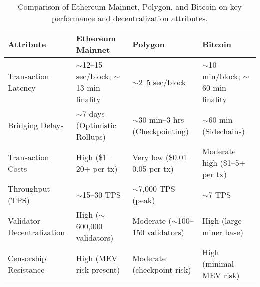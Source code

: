 \begin{table}[ht]
\centering
\begin{tabular}{|p{2cm}|p{2cm}|p{2cm}|p{2cm}|}
\hline
\textbf{Attribute} & \textbf{Ethereum Mainnet} & \textbf{Polygon} & \textbf{Bitcoin} \\
\hline
Transaction Latency & $\sim$12--15 sec/block; \newline $\sim$13 min finality & $\sim$2--5 sec/block & $\sim$10 min/block; \newline $\sim$60 min finality \\
\hline
Bridging Delays & $\sim$7 days \newline (Optimistic Rollups) & $\sim$30 min--3 hrs \newline (Checkpointing) & $\sim$60 min \newline (Sidechains) \\
\hline
Transaction Costs & High \newline (\$1--20+ per tx) & Very low \newline (\$0.01--0.05 per tx) & Moderate--high \newline (\$1--5+ per tx) \\
\hline
Throughput (TPS) & $\sim$15--30 TPS & $\sim$7,000 TPS (peak) & $\sim$7 TPS \\
\hline
Validator Decentralization & High \newline ($\sim$600,000 validators) & Moderate \newline ($\sim$100--150 validators) & High \newline (large miner base) \\
\hline
Censorship Resistance & High \newline (MEV risk present) & Moderate \newline (checkpoint risk) & High \newline (minimal MEV risk) \\
\hline
\end{tabular}
\caption{Comparison of Ethereum Mainnet, Polygon, and Bitcoin on key performance and decentralization attributes.}
\end{table}

